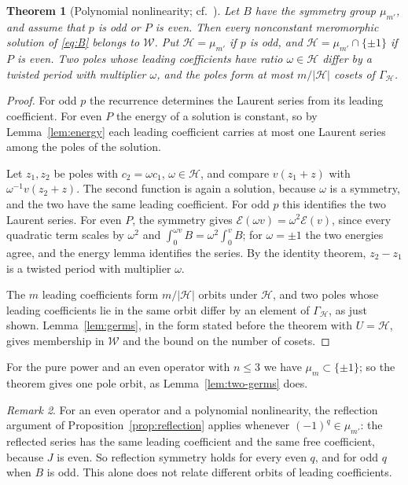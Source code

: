 \documentclass[11pt]{article}
\newtheorem{theorem}{Theorem}[section]
\theoremstyle{definition}
\theoremstyle{remark}
\newtheorem{remark}[theorem]{Remark}
\numberwithin{equation}{section}
\newcommand{\Wclass}{\mathcal W}
\begin{document}
\begin{theorem}[Polynomial nonlinearity; cf.\ \citep{Eremenko2006,ConteNgWong2012,Wu2014}]\label{thm:general}
Let \(B\) have the symmetry group \(\mu_{m'}\), and assume that \(p\) is
odd or \(P\) is even. Then every nonconstant meromorphic solution of
\eqref{eq:B} belongs to \(\Wclass\). Put \(\mathcal H=\mu_{m'}\) if
\(p\) is odd, and \(\mathcal H=\mu_{m'}\cap\{\pm1\}\) if \(P\) is even.
Two poles whose leading coefficients have ratio \(\omega\in\mathcal H\)
differ by a twisted period with multiplier \(\omega\), and the poles
form at most \(m/|\mathcal H|\) cosets of \(\Gamma_{\mathcal H}\).
\end{theorem}

\begin{proof}
For odd \(p\) the recurrence determines the Laurent series from its
leading coefficient. For even \(P\) the energy of a solution is
constant, so by Lemma~\ref{lem:energy} each leading coefficient carries
at most one Laurent series among the poles of the solution.

Let \(z_1,z_2\) be poles with \(c_2=\omega c_1\), \(\omega\in\mathcal
H\), and compare \(v(z_1+z)\) with \(\omega^{-1}v(z_2+z)\). The second
function is again a solution, because \(\omega\) is a symmetry, and the
two have the same leading coefficient. For odd \(p\) this identifies
the two Laurent series. For even \(P\), the symmetry gives
\(\mathcal E(\omega v)=\omega^2\mathcal E(v)\), since every quadratic
term scales by \(\omega^2\) and
\(\int_0^{\omega v}B=\omega^2\int_0^vB\); for \(\omega=\pm1\) the two
energies agree, and the energy lemma identifies the series. By the
identity theorem, \(z_2-z_1\) is a twisted period with multiplier
\(\omega\).

The \(m\) leading coefficients form \(m/|\mathcal H|\) orbits under
\(\mathcal H\), and two poles whose leading coefficients lie in the same
orbit differ by an element of \(\Gamma_{\mathcal H}\), as just shown.
Lemma~\ref{lem:germs}, in the form stated before the theorem with
\(U=\mathcal H\), gives membership in \(\Wclass\) and the bound on the
number of cosets.
\end{proof}

For the pure power and an even operator with \(n\le3\) we have
\(\mu_m\subset\{\pm1\}\); so the theorem gives one pole orbit, as
Lemma~\ref{lem:two-germs} does.

\begin{remark}
For an even operator and a polynomial nonlinearity, the reflection
argument of Proposition~\ref{prop:reflection} applies whenever
\((-1)^q\in\mu_{m'}\): the reflected series has the same leading
coefficient and the same free coefficient, because \(J\) is even. So
reflection symmetry holds for every even \(q\), and for odd \(q\) when
\(B\) is odd. This alone does not relate different orbits of leading
coefficients.
\end{remark}
\end{document}
